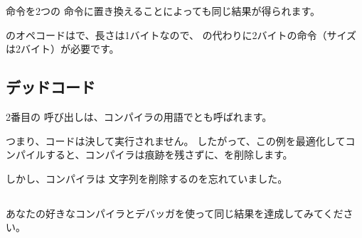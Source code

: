 

\JMP 命令を2つの \NOP 命令に置き換えることによっても同じ結果が得られます。

\NOP のオペコードはで、長さは1バイトなので、 \JMP の代わりに2バイトの命令（サイズは2バイト）が必要です。

\subsection{デッドコード}

2番目の \printf 呼び出しは、コンパイラの用語でとも呼ばれます。

つまり、コードは決して実行されません。
したがって、この例を最適化してコンパイルすると、コンパイラは痕跡を残さずに、を削除します。



しかし、コンパイラは 文字列を削除するのを忘れていました。


\subsection{\Exercise}


あなたの好きなコンパイラとデバッガを使って同じ結果を達成してみてください。
